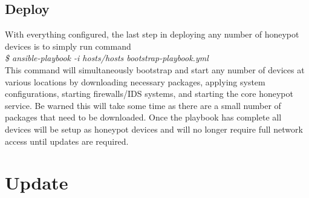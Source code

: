 
\subsection{Deploy}
With everything configured, the last step in deploying any number of honeypot devices is to simply run command
\\\newline
\textit{\$ ansible-playbook -i hosts/hosts bootstrap-playbook.yml}
\\\newline
This command will simultaneously bootstrap and start any number of devices at various locations by downloading necessary packages, applying system configurations, starting firewalls/IDS systems, and starting the core honeypot service. Be warned this will take some time as there are a small number of packages that need to be downloaded. Once the playbook has complete all devices will be setup as honeypot devices and will no longer require full network access until updates are required.

\section{Update}


